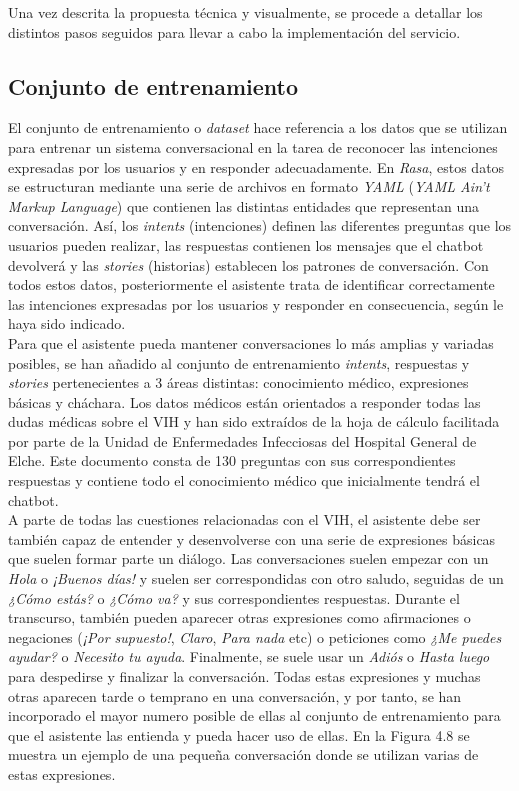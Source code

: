 Una vez descrita la propuesta técnica y visualmente, se procede a detallar los distintos pasos seguidos para llevar a cabo la implementación del servicio.\\

\subsection{Conjunto de entrenamiento}
El conjunto de entrenamiento o \textit{dataset} hace referencia a los datos que se utilizan para entrenar un sistema conversacional en la tarea de reconocer las intenciones expresadas por los usuarios y en responder adecuadamente. En \textit{Rasa}, estos datos se estructuran mediante una serie de archivos en formato \textit{YAML} (\textit{YAML Ain't Markup Language}) que contienen las distintas entidades que representan una conversación. Así, los \textit{intents}  (intenciones) definen las diferentes preguntas que los usuarios pueden realizar, las respuestas contienen los mensajes que el chatbot devolverá y las \textit{stories} (historias) establecen los patrones de conversación. Con todos estos datos, posteriormente el asistente trata de identificar correctamente las intenciones expresadas por los usuarios y responder en consecuencia, según le haya sido indicado.\\

Para que el asistente pueda mantener conversaciones lo más amplias y variadas posibles, se han añadido al conjunto de entrenamiento \textit{intents}, respuestas y \textit{stories} pertenecientes a 3 áreas distintas: conocimiento médico, expresiones básicas y cháchara. Los datos médicos están orientados a responder todas las dudas médicas sobre el VIH y han sido extraídos de la hoja de cálculo facilitada por parte de la Unidad de Enfermedades Infecciosas del Hospital General de Elche. Este documento consta de 130 preguntas con sus correspondientes respuestas y contiene todo el conocimiento médico que inicialmente tendrá el chatbot.\\

A parte de todas las cuestiones relacionadas con el VIH, el asistente debe ser también capaz de entender y desenvolverse con una serie de expresiones básicas que suelen formar parte un diálogo. Las conversaciones suelen empezar con un \textit{Hola} o \textit{¡Buenos días!} y suelen ser correspondidas con otro saludo, seguidas de un \textit{¿Cómo estás?} o \textit{¿Cómo va?} y sus correspondientes respuestas. Durante el transcurso, también pueden aparecer otras expresiones como afirmaciones o negaciones (\textit{¡Por supuesto!}, \textit{Claro}, \textit{Para nada} etc) o peticiones como \textit{¿Me puedes ayudar?} o \textit{Necesito tu ayuda}. Finalmente, se suele usar un \textit{Adiós} o \textit{Hasta luego} para despedirse y finalizar la conversación. Todas estas expresiones y muchas otras aparecen tarde o temprano en una conversación, y por tanto, se han incorporado el mayor numero posible de ellas al conjunto de entrenamiento para que el asistente las entienda y pueda hacer uso de ellas. En la Figura 4.8 se muestra un ejemplo de una pequeña conversación donde se utilizan varias de estas expresiones.\\


